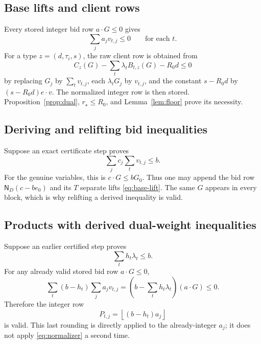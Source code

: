 \documentclass[11pt]{article}
\numberwithin{equation}{section}
\theoremstyle{definition}
\newcommand{\rstar}{r_\star}
\newcommand{\Rzero}{R_0}
\newcommand{\fl}[1]{\left\lfloor#1\right\rfloor}
\newcommand{\normrow}{\mathsf N_D}
\begin{document}
\subsection{Base lifts and client rows}
Every stored integer bid row $a\cdot G\le0$ gives
\begin{equation}\label{eq:base-lift}
 \sum_ja_jv_{t,j}\le0\qquad\text{for each }t.
\end{equation}
For a type $z=(d,\tau_i,s)$, the raw client row is obtained from
\begin{equation}\label{eq:raw-client}
 C_z(G)-\sum_t\lambda_tB_{t,z}(G)-\Rzero d\le0
\end{equation}
by replacing $G_j$ by $\sum_tv_{t,j}$, each $\lambda_tG_j$ by $v_{t,j}$,
and the constant $s-\Rzero d$ by $(s-\Rzero d)e\cdot v$.
The normalized integer row is then stored. Proposition~\ref{prop:dual},
$\rstar\le\Rzero$, and Lemma~\ref{lem:floor} prove its necessity.

\subsection{Deriving and relifting bid inequalities}
Suppose an exact certificate step proves
\begin{equation}\label{eq:derived-g}
 \sum_jc_j\sum_tv_{t,j}\le b.
\end{equation}
For the genuine variables, this is $c\cdot G\le bG_0$.
Thus one may append the bid row
$\normrow(c-be_0)$ and its $T$ separate lifts
\eqref{eq:base-lift}. The same $G$ appears in every block, which is why
relifting a derived inequality is valid.

\subsection{Products with derived dual-weight inequalities}
Suppose an earlier certified step proves
\begin{equation}\label{eq:lambda-cut}
 \sum_th_t\lambda_t\le b.
\end{equation}
For any already valid stored bid row $a\cdot G\le0$,
\begin{equation}\label{eq:product-exact}
 \sum_t(b-h_t)\sum_ja_jv_{t,j}
 =\left(b-\sum_th_t\lambda_t\right)(a\cdot G)\le0.
\end{equation}
Therefore the integer row
\begin{equation}\label{eq:product-floor}
 P_{t,j}=\fl{(b-h_t)a_j}
\end{equation}
is valid. This last rounding is directly applied to the already-integer
$a_j$; it does not apply \eqref{eq:normalizer} a second time.
\end{document}

